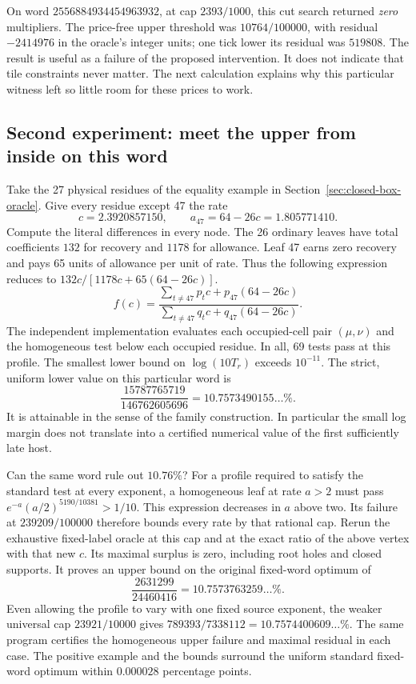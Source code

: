 \documentclass[12pt,letterpaper]{article}
\begin{document}
On word \(2556884934454963932\), at cap \(2393/1000\), this cut search returned \emph{zero} multipliers. The price-free upper threshold was \(10764/100000\), with residual \(-2414976\) in the oracle's integer units; one tick lower its residual was \(519808\). The result is useful as a failure of the proposed intervention. It does not indicate that tile constraints never matter. The next calculation explains why this particular witness left so little room for these prices to work.

\subsection{Second experiment: meet the upper from inside on this word}
Take the 27 physical residues of the equality example in Section~\ref{sec:closed-box-oracle}. Give every residue except 47 the rate
\[
 c=2.3920857150,\qquad a_{47}=64-26c=1.805771410.
\]
Compute the literal differences in every node. The 26 ordinary leaves have total coefficients \(132\) for recovery and \(1178\) for allowance. Leaf 47 earns zero recovery and pays 65 units of allowance per unit of rate. Thus the following expression reduces to \(132c/[1178c+65(64-26c)]\).
\[
 f(c)=\frac{\sum_{t\ne47}p_t c+p_{47}(64-26c)}
            {\sum_{t\ne47}q_t c+q_{47}(64-26c)} .
\]
The independent implementation evaluates each occupied-cell pair \((\mu,\nu)\) and the homogeneous test below each occupied residue. In all, 69 tests pass at this profile. The smallest lower bound on \(\log(10T_r)\) exceeds \(10^{-11}\). The strict, uniform lower value on this particular word is
\[
 \frac{15787765719}{146762605696}=10.7573490155\ldots\%.
\]
It is attainable in the sense of the family construction. In particular the small log margin does not translate into a certified numerical value of the first sufficiently late host.

Can the same word rule out \(10.76\%\)? For a profile required to satisfy the standard test at every exponent, a homogeneous leaf at rate \(a>2\) must pass \(e^{-a}(a/2)^{5190/10381}>1/10\). This expression decreases in \(a\) above two. Its failure at \(239209/100000\) therefore bounds every rate by that rational cap. Rerun the exhaustive fixed-label oracle at this cap and at the exact ratio of the above vertex with that new \(c\). Its maximal surplus is zero, including root holes and closed supports. It proves an upper bound on the original fixed-word optimum of
\[
 \frac{2631299}{24460416}=10.7573763259\ldots\%.
\]
Even allowing the profile to vary with one fixed source exponent, the weaker universal cap \(23921/10000\) gives \(789393/7338112=10.7574400609\ldots\%\). The same program certifies the homogeneous upper failure and maximal residual in each case. The positive example and the bounds surround the uniform standard fixed-word optimum within \(0.000028\) percentage points.
\end{document}
